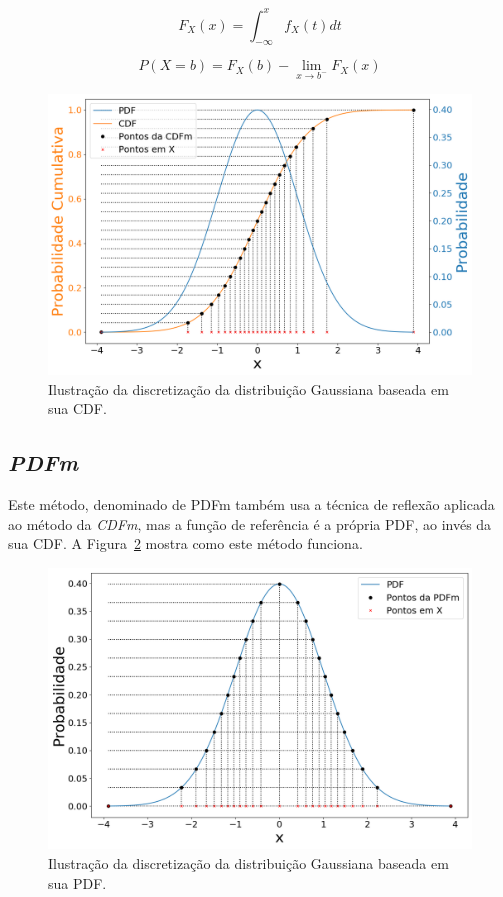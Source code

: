 \begin{equation}
\displaystyle F_X(x) = \int_{-\infty}^{x} f_X(t)dt
\label{equ:CDF}
\end{equation}

\begin{equation}
 {P} (X=b)=F_{X}(b)-\lim _{x\to b^{-}}F_{X}(x)
 \label{equ:CDF_disc}
\end{equation}

\begin{figure}[H]
	\centering
	\includegraphics[width=0.6\linewidth]{./figuras/CDFm_normal_1}
	\caption{Ilustração da discretização da distribuição Gaussiana baseada em sua CDF.}
	\label{fig:CDFm_curve}
\end{figure}



\subsection{\textit{PDFm}}
Este método, denominado de \ac{PDFm} também usa a técnica de reflexão aplicada ao método da \textit{CDFm}, mas a função de referência é a própria \ac{PDF}, ao invés da sua \ac{CDF}. A Figura~\ref{fig:PDFm_curve} mostra como este método funciona. 

\begin{figure}[H]
	\centering
	\includegraphics[width=0.67\linewidth]{./figuras/PDFm_normal_1}
	\caption{Ilustração da discretização da distribuição Gaussiana baseada em sua PDF.}
	\label{fig:PDFm_curve}
\end{figure}

